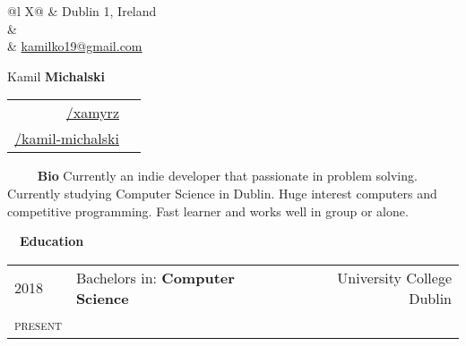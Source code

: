 \documentclass[a4paper, 11pt]{article}
\newcommand{\sectitle}[2]{\large{#1} \ \ \Large{\textbf{#2}}}
\begin{document}
	\pagestyle{fancy}

	\begin{center}
	\begin{multicols}{3}
		\begin{tabularx}{\linewidth}{@{}l X@{}}
			\faMapMarker & Dublin 1, Ireland \\
			\IfFileExists{confidential.tex}{\faPhone & \href{tel:\phoneNumber}{\prettyPhoneNumber} \\}{}
			\faEnvelope	 & \href{mailto:kamilko19@gmail.coml}{kamilko19@gmail.com} \\
		\end{tabularx} \vfill \null

		\columnbreak
			{ \Huge{Kamil \textbf{Michalski}}}
		\columnbreak

		\begin{tabularx}{\linewidth}{R | r}
				\href{https://github.com/xamyrz}{/xamyrz} & \faGithub \\
				\href{https://www.linkedin.com/in/kamil-michalski-7069451ab/}{/kamil-michalski} & \faLinkedin \\
		\end{tabularx} \vfill \null
	\end{multicols}
	\end{center}


	\begin{section}{\sectitle{\ \faUser}{\ Bio}}
		Currently an indie developer that passionate in problem solving. Currently studying Computer Science in Dublin. Huge interest computers and competitive programming. Fast learner and works well in group or alone. \\
	\end{section}

	\newcommand{\education}[5]{
		\textsc{#1} & #3: \textbf{#4} & \small{#5} \\[-0.5ex]
		\textsc{#2} & \multicolumn{2}{l}{}\\
	}


	\begin{section}{\sectitle{\faGraduationCap}{Education}}
		\begin{tabularx}{\linewidth}{@{}p{1.4cm} | X  r}
			\education{2018}{present}{Bachelors in}{Computer Science}{University College Dublin}
		\end{tabularx}
		\\ \\
	\end{section}

	\newcommand{\tech}[1]{\textbf{#1}}
\end{document}
